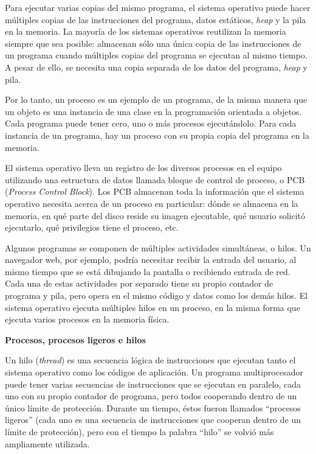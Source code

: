 \documentclass[10pt]{book}
\begin{document}
Para ejecutar varias copias del mismo programa, el sistema operativo puede hacer múltiples copias de las instrucciones del programa, datos estáticos, \textit{heap} y la pila en la memoria. La mayoría de los sistemas operativos reutilizan la memoria siempre que sea posible: almacenan sólo una única copia de las instrucciones de un programa cuando múltiples copias del programa se ejecutan al mismo tiempo. A pesar de ello, se necesita una copia separada de los datos del programa, \textit{heap} y pila.

Por lo tanto, un proceso es un ejemplo de un programa, de la misma manera que un objeto es una instancia de una clase en la programación orientada a objetos. Cada programa puede tener cero, uno o más procesos ejecutándolo. Para cada instancia de un programa, hay un proceso con su propia copia del programa en la memoria.

El sistema operativo lleva un registro de los diversos procesos en el equipo utilizando una estructura de datos llamada bloque de control de proceso, o PCB (\textit{Process Control Block}). Los PCB almacenan toda la información que el sistema operativo necesita acerca de un proceso en particular: dónde se almacena en la memoria, en qué parte del disco reside su imagen ejecutable, qué usuario solicitó ejecutarlo, qué privilegios tiene el proceso, etc.

Algunos programas se componen de múltiples actividades simultáneas, o hilos. Un navegador web, por ejemplo, podría necesitar recibir la entrada del usuario, al mismo tiempo que se está dibujando la pantalla o recibiendo entrada de red. Cada una de estas actividades por separado tiene su propio contador de programa y pila, pero opera en el mismo código y datos como los demás hilos. El sistema operativo ejecuta múltiples hilos en un proceso, en la misma forma que ejecuta varios procesos en la memoria física.

\textbf{Procesos, procesos ligeros e hilos}

Un hilo (\textit{thread}) es una secuencia lógica de instrucciones que ejecutan tanto el sistema operativo como los códigos de aplicación. Un programa multiprocesador puede tener varias secuencias de instrucciones que se ejecutan en paralelo, cada uno con su propio contador de programa, pero todos cooperando dentro de un único límite de protección. Durante un tiempo, éstos fueron llamados ``procesos ligeros'' (cada uno es una secuencia de instrucciones que cooperan dentro de un límite de protección), pero con el tiempo la palabra ``hilo'' se volvió más ampliamente utilizada.
\end{document}
